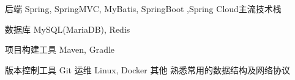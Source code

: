 

\begin{cvskills}

  \cvskill
    {后端} %
    {Spring, SpringMVC, MyBatis, SpringBoot ,Spring Cloud主流技术栈} %

  \cvskill
    {数据库} %
	{MySQL(MariaDB), Redis} %

  \cvskill
    {项目构建工具} %
    {Maven, Gradle} %

  \cvskill
    {版本控制工具} %
    {Git} %
   \cvskill
    {运维} %
    {Linux, Docker } %
    \cvskill
    {其他} %
    {熟悉常用的数据结构及网络协议 } %
	

\end{cvskills}
